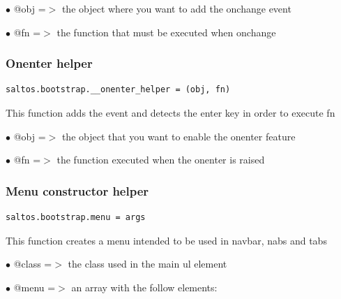 \documentclass[a4paper]{article}
\begin{document}
\begin{compactitem}
\item[\color{myblue}$\bullet$] @obj   =$>$ the object where you want to add the onchange event
\item[\color{myblue}$\bullet$] @fn    =$>$ the function that must be executed when onchange
\end{compactitem}

\hypertarget{toc101}{}
\subsubsection{Onenter helper}

\begin{lstlisting}
saltos.bootstrap.__onenter_helper = (obj, fn)
\end{lstlisting}

This function adds the event and detects the enter key in order to execute fn

\begin{compactitem}
\item[\color{myblue}$\bullet$] @obj =$>$ the object that you want to enable the onenter feature
\item[\color{myblue}$\bullet$] @fn  =$>$ the function executed when the onenter is raised
\end{compactitem}

\hypertarget{toc102}{}
\subsubsection{Menu constructor helper}

\begin{lstlisting}
saltos.bootstrap.menu = args
\end{lstlisting}

This function creates a menu intended to be used in navbar, nabs and tabs

\begin{compactitem}
\item[\color{myblue}$\bullet$] @class =$>$ the class used in the main ul element
\item[\color{myblue}$\bullet$] @menu  =$>$ an array with the follow elements:
\end{compactitem}
\end{document}
